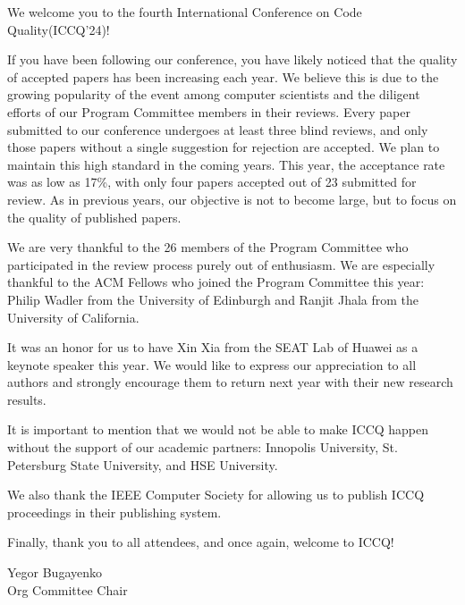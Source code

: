 
\cleardoublepage
{}

We welcome you to the fourth International Conference on Code Quality(ICCQ'24)!

If you have been following our conference, you have likely noticed that the
quality of accepted papers has been increasing each year. We believe this is
due to the growing popularity of the event among computer scientists
and the diligent efforts of our Program Committee members in their reviews.
Every paper submitted to our conference undergoes at least three blind reviews,
and only those papers without a single suggestion for rejection are accepted.
We plan to maintain this high standard in the coming years. This year, the
acceptance rate was as low as 17\%, with only four papers accepted out of 23
submitted for review. As in previous years, our objective is not to become
large, but to focus on the quality of published papers.

We are very thankful to the 26 members of the Program Committee who participated
in the review process purely out of enthusiasm. We are especially thankful to
the ACM Fellows who joined the Program Committee this year: Philip Wadler from
the University of Edinburgh and Ranjit Jhala from the University of
California.

It was an honor for us to have Xin Xia from the SEAT Lab of Huawei as a keynote
speaker this year. We would like to express our appreciation to all authors and
strongly encourage them to return next year with their new research results.

It is important to mention that we would not be able to make ICCQ happen without
the support of our academic partners: Innopolis University, St. Petersburg
State University, and HSE University.

We also thank the IEEE Computer Society for allowing us to publish ICCQ
proceedings in their publishing system.

Finally, thank you to all attendees, and once again, welcome to ICCQ!

\vspace{18pt}
Yegor Bugayenko\\
Org Committee Chair
